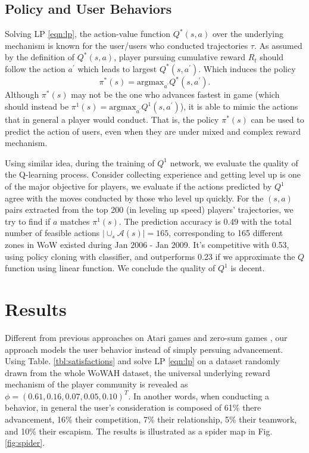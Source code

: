 \documentclass{sigchi}
\begin{document}
\subsection{Policy and User Behaviors}

Solving LP \eqref{eqn:lp}, the action-value function $Q^\ast(s,a)$ over the underlying mechanism is known for the user/users who conducted trajectories $\tau$.
As assumed by the definition of $Q^\ast(s,a)$, player pursuing cumulative reward $R_t$ should follow the action $a^\prime$ which leads to largest $Q^\ast(s,a^\prime)$.
Which induces the policy
\begin{equation*}
\pi^\ast(s) = \text{argmax}_{a^\prime}Q^\ast(s,a^\prime).
\end{equation*}
Although $\pi^\ast(s)$ may not be the one who advances fastest in game (which should instead be $\pi^1(s) = \text{argmax}_{a^\prime}Q^1(s,a^\prime)$), it is able to mimic the actions that in general a player would conduct. 
That is, the policy $\pi^\ast(s)$ can be used to predict the action of users, even when they are under mixed and complex reward mechanism.

Using similar idea, during the training of $Q^1$ network, we evaluate the quality of the Q-learning process.
Consider collecting experience and getting level up is one of the major objective for players, we evaluate if the actions predicted by $Q^1$ agree with the moves conducted by those who level up quickly. 
For the $(s,a)$ pairs extracted from the top 200 (in leveling up speed) players' trajectories, we try to find if $a$ matches $\pi^1(s)$. 
The prediction accuracy is 0.49 with the total number of feasible actions $|\cup_s\mathcal{A}(s)|=165$, corresponding to 165 different zones in WoW existed during Jan 2006 - Jan 2009. 
It's competitive with 0.53, using policy cloning \cite{amit2002parametric,sammut1992learning} with classifier, and outperforms 0.23 if we approximate the $Q$ function using linear function. 
We conclude the quality of $Q^1$ is decent.

\section{Results}

Different from previous approaches on Atari games \cite{mnih2015human} and zero-sum games \cite{silver2016mastering,heinrich2016deep}, our approach models the user behavior instead of simply persuing advancement. Using Table. \ref{tbl:satisfactions} and solve LP \eqref{eqn:lp} on a dataset randomly drawn from the whole WoWAH dataset, the universal underlying reward mechanism of the player community is revealed as $\phi=(0.61, 0.16, 0.07, 0.05, 0.10)^T$. In another words, when conducting a behavior, in general the user's consideration is composed of 61\% there advancement, 16\% their competition, 7\% their relationship, 5\% their teamwork, and 10\% their escapism. The results is illustrated as a spider map in Fig. \ref{fig:spider}.
\end{document}
